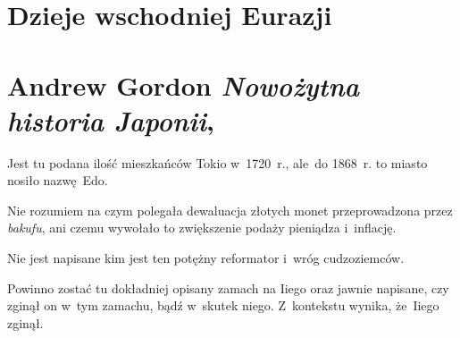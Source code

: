 \documentclass[a4paper,11pt]{article}
\numberwithin{equation}{section}
\begin{document}










\newpage

\section{Dzieje wschodniej Eurazji}


\VerSpaceTwo



\section{Andrew Gordon \textit{Nowożytna historia Japonii},
  \cite{GordonNowozytnaHistoriaJaponii2010}}


\vspace{0em}


\vspace{0em}


\noindent
{} Jest tu podana ilość mieszkańców Tokio w~1720~r.,
ale~do
1868~r. to miasto nosiło nazwę~Edo.

\VerSpaceFour





\noindent
{} Nie rozumiem na czym polegała dewaluacja złotych monet
przeprowadzona przez \textit{bakufu}, ani czemu wywołało to zwiększenie
podaży pieniądza i~inflację.

\VerSpaceFour





\noindent
{} Nie jest napisane kim jest ten potężny reformator
i~wróg cudzoziemców.

\VerSpaceFour





\noindent
{} Powinno zostać tu dokładniej opisany zamach na Iiego oraz jawnie
napisane, czy zginął on w~tym zamachu, bądź w~skutek niego. Z~kontekstu
wynika, że~Iiego zginął.

\VerSpaceFour
\end{document}
